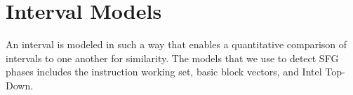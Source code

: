 \section{Interval Models}

An interval is modeled in such a way that enables a quantitative comparison of intervals to one another for similarity. The models that we use to detect SFG phases includes the instruction working set, basic block vectors, and Intel Top-Down. 




